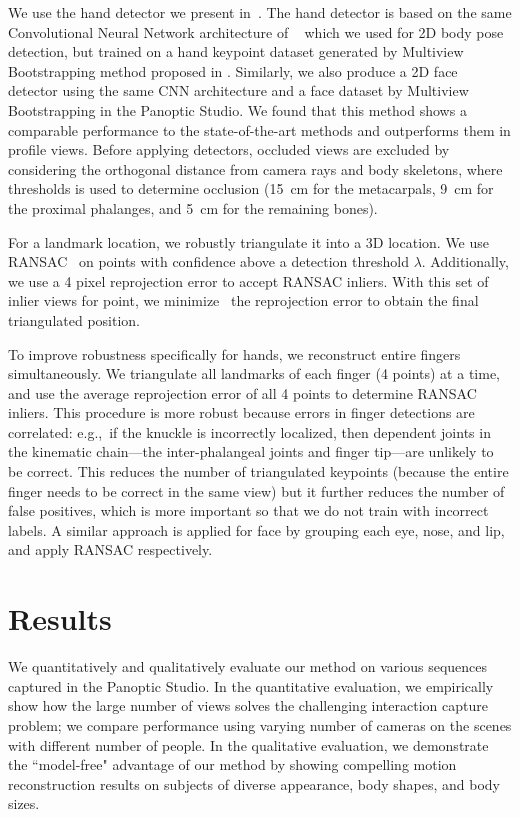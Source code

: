 We use the hand detector we present in~\cite{simon2017hand}. The hand detector is based on the same Convolutional Neural Network architecture of ~\cite{Wei2016} which we used for 2D body pose detection, but trained on a hand keypoint dataset generated by Multiview Bootstrapping method proposed in \cite{simon2017hand}. Similarly, we also produce a 2D face detector using the same CNN architecture and a face dataset by Multiview Bootstrapping in the Panoptic Studio. We found that this method shows a comparable performance to the state-of-the-art methods and outperforms them in profile views.  Before applying detectors, occluded views are excluded by considering the orthogonal distance from camera rays and body skeletons, where thresholds is used to determine occlusion (15~cm for the metacarpals, 9~cm for the proximal phalanges, and 5~cm for the remaining bones). 


For a landmark location, we robustly triangulate it into a 3D location. We use RANSAC~\cite{Fischler-81} on points with confidence above a detection threshold $\lambda$. Additionally, we use a 4 pixel reprojection error to accept RANSAC inliers. With this set of inlier views for point, we minimize~\cite{ceres-solver} the reprojection error to obtain the final triangulated position. 

To improve robustness specifically for hands, we reconstruct entire fingers simultaneously. We triangulate all landmarks of each finger (4 points) at a time, and use the average reprojection error of all 4 points to determine RANSAC inliers. This procedure is more robust because errors in finger detections are correlated: e.g.,~if the knuckle is incorrectly localized, then dependent joints in the kinematic chain---the inter-phalangeal joints and finger tip---are unlikely to be correct. This reduces the number of triangulated keypoints (because the entire finger needs to be correct in the same view) but it further reduces the number of false positives, which is more important so that we do not train with incorrect labels. A similar approach is applied for face by grouping each eye, nose, and lip, and apply RANSAC respectively. 

\section{Results}

We quantitatively and qualitatively evaluate our method on various sequences captured in the Panoptic Studio. In the quantitative evaluation, we empirically show how the large number of views solves the challenging interaction capture problem; we compare performance using varying number of cameras on the scenes with different number of people. In the qualitative evaluation, we demonstrate the ``model-free" advantage of our method by showing compelling motion reconstruction results on subjects of diverse appearance, body shapes, and body sizes.


